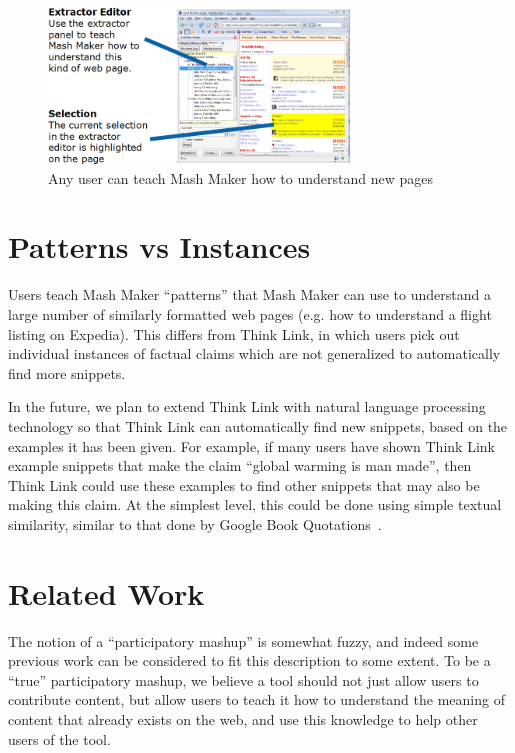 \documentclass{chi2009}
\begin{document}
\begin{figure}[tb]
	\begin{center}
	\includegraphics[width=8cm]{../mmpics/extractor_summary.png}
	\caption{Any user can teach Mash Maker how to understand new pages}
	\label{extractedit}
	\end{center}
\end{figure}


\section{Patterns vs Instances}

Users teach Mash Maker ``patterns'' that Mash Maker can use to understand a large number of similarly formatted web pages (e.g. how to understand a flight listing on Expedia). This differs from Think Link, in which users pick out individual instances of factual claims which are not generalized to automatically find more snippets.

In the future, we plan to extend Think Link with natural language processing technology so that Think Link can automatically find new snippets, based on the examples it has been given. For example, if many users have shown Think Link example snippets that make the claim ``global warming is man made'', then Think Link could use these examples to find other snippets that may also be making this claim. At the simplest level, this could be done using simple textual similarity, similar to that done by Google Book Quotations~\cite{quotations}.


\section{Related Work}

The notion of a ``participatory mashup'' is somewhat fuzzy, and indeed some previous work can be considered to fit this description to some extent. To be a ``true'' participatory mashup, we believe a tool should not just allow users to contribute content, but allow users to teach it how to understand the meaning of content that already exists on the web, and use this knowledge to help other users of the tool.
\end{document}
